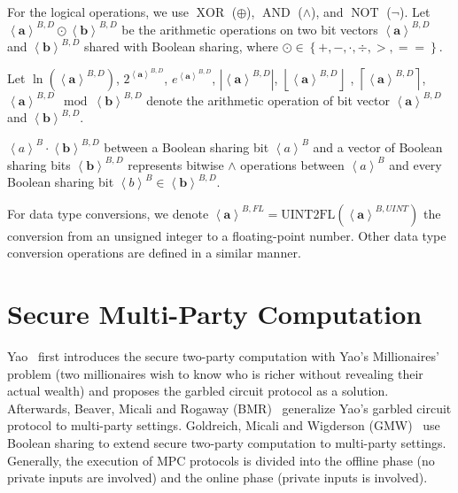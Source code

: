 For the logical operations, we use $\operatorname{XOR}$ ($\oplus $), $\operatorname{AND}$ ($\land $), and $\operatorname{NOT}$ ($\neg$).
Let $\left\langle \boldsymbol{a}\right\rangle^{B,D} \odot \left\langle \boldsymbol{b}\right\rangle^{B,D}$ be the arithmetic operations on two bit vectors $\left\langle \boldsymbol{a}\right\rangle^{B,D}$ and $ \left\langle \boldsymbol{b}\right\rangle^{B,D} $ shared with Boolean sharing, where $\odot\in\left\{+, -, \cdot, \div, >, ==\right\} $.

Let $\ln\left(\left\langle \boldsymbol{a}\right\rangle^{B,D} \right) $, $2^{\left\langle \boldsymbol{a}\right\rangle^{B,D} } $, $e^{\left\langle \boldsymbol{a}\right\rangle^{B,D} }$, $\left\lvert \left\langle \boldsymbol{a}\right\rangle^{B,D} \right\rvert $, $\left\lfloor \left\langle \boldsymbol{a}\right\rangle^{B,D} \right\rfloor $ , $\left\lceil \left\langle \boldsymbol{a}\right\rangle^{B,D} \right\rceil $, $\left\langle \boldsymbol{a}\right\rangle^{B,D} \mod \left\langle \boldsymbol{b}\right\rangle^{B,D} $ denote the arithmetic operation of bit vector $\left\langle \boldsymbol{a}\right\rangle^{B,D} $ and $\left\langle \boldsymbol{b}\right\rangle^{B,D} $.

$\left\langle a\right\rangle ^B \cdot \left\langle \boldsymbol{b}\right\rangle ^{B,D}$ between a Boolean sharing bit $\left\langle a\right\rangle ^B$ and a vector of Boolean sharing bits $\left\langle \boldsymbol{b}\right\rangle ^{B,D}$  represents bitwise $\land$ operations between $\left\langle a\right\rangle ^B$ and every Boolean sharing bit $\left\langle b\right\rangle^B \in\left\langle \boldsymbol{b}\right\rangle ^{B,D}$.

For data type conversions, we denote $\left\langle \boldsymbol{a}\right\rangle ^{B,FL}=\text{UINT2FL}\left(\left\langle \boldsymbol{a}\right\rangle ^{B,UINT}\right) $ the conversion from an unsigned integer to a floating-point number. Other data type conversion operations are defined in a similar manner.



\section{Secure Multi-Party Computation}
\label{sec:secureMultipartyComputation}
Yao~\cite{Yao86} first introduces the secure two-party computation with Yao's Millionaires' problem (two millionaires wish to know who is richer without revealing their actual wealth) and proposes the garbled circuit protocol as a solution.
Afterwards, Beaver, Micali and Rogaway (BMR)~\cite{beaver1990round} generalize Yao's garbled circuit protocol to multi-party settings. Goldreich, Micali and Wigderson (GMW)~\cite{goldwasser1987play} use Boolean sharing to extend secure two-party computation to multi-party settings.
Generally, the execution of MPC protocols is divided into the offline phase (no private inputs are involved) and the online phase (private inputs is involved).

